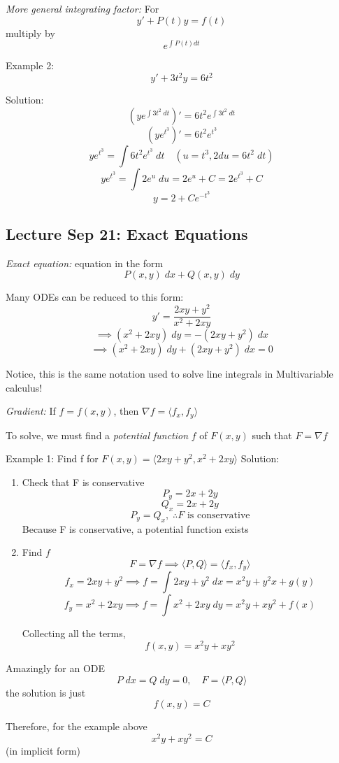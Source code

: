\documentclass[12pt]{article}
\begin{document}
\emph{More general integrating factor:}
For \[y' + P(t) y = f(t)\]
multiply by 
\[e^{\int P(t) dt}\]

Example 2: 
\[y' + 3t^2 y = 6t^2\]

Solution:
\[(y e^{\int 3t^2\; dt})'= 6t^2 e^{\int 3t^2\; dt}\]
\[(y e^{t^3})' = 6t^2 e^{t^3}\]
\[ye^{t^3} = \int 6t^2 e^{t^3} \; dt \quad (u = t^3, 2du = 6t^2\; dt)\]
\[ye^{t^3} = \int 2e^u \; du = 2e^u + C = 2e^{t^3} + C\]
\[y = 2 + Ce^{-t^3}\]

\subsection*{Lecture Sep 21: Exact Equations}
\emph{Exact equation:} equation in the form 
\[P(x, y) \; dx + Q(x, y) \; dy\]

Many ODEs can be reduced to this form:
\[y' = \frac{2xy + y^2}{x^2 + 2xy}\]
\[\implies (x^2 + 2xy) \; dy = -(2xy + y^2) \; dx\]
\[\implies (x^2 + 2xy) \; dy + (2xy + y^2) \; dx = 0\]

Notice, this is the same notation used to solve line integrals in Multivariable calculus!

\emph{Gradient:} If $f = f(x,y)$, then $\nabla f = \langle f_x, f_y \rangle$

To solve, we must find a \emph{potential function} $f$ of $F(x, y)$ such that $F = \nabla f$

Example 1: Find f for $F(x,y) = \langle2xy + y^2, x^2 + 2xy\rangle$
Solution:
\begin{enumerate}
    \item Check that F is conservative
    \[P_y = 2x + 2y\]
    \[Q_x = 2x + 2y\]
    \[P_y = Q_x, \; \therefore F \text{ is conservative}\]
    Because F is conservative, a potential function exists 

    \item Find $f$
    \[F = \nabla f \implies \langle P, Q\rangle = \langle f_x, f_y \rangle\]
    \[f_x = 2xy + y^2 \implies f = \int 2xy + y^2\; dx = x^2y + y^2x + g(y)\]
    \[f_y = x^2 + 2xy \implies f = \int x^2 + 2xy\; dy = x^2 y + xy^2 + f(x)\]

    Collecting all the terms,
    \[f(x, y) = x^2 y + xy^2\]
\end{enumerate}

Amazingly for an ODE 
\[P\; dx = Q\; dy = 0, \quad F = \langle P, Q \rangle\]
the solution is just 
\[f(x, y) = C\]

Therefore, for the example above 
\[x^2y + xy^2 = C\]
(in implicit form)
\end{document}
